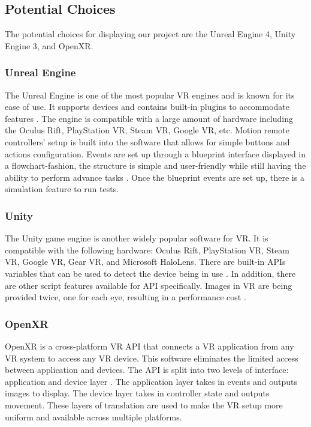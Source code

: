 \documentclass[onecolumn, draftclsnofoot,10pt, compsoc]{IEEEtran}
\begin{document}
\subsection{Potential Choices}
\begin{singlespace}
The potential choices for displaying our project are the Unreal Engine 4, Unity Engine 3, and OpenXR.  
\end{singlespace}

\subsubsection{Unreal Engine}
\begin{singlespace}
The Unreal Engine is one of the most popular VR engines and is known for its ease of use. It supports devices and contains built-in plugins to accommodate features \cite{looman}. The engine is compatible with a large amount of hardware including the Oculus Rift, PlayStation VR, Steam VR, Google VR, etc. Motion remote controllers’ setup is built into the software that allows for simple buttons and actions configuration. Events are set up through a blueprint interface displayed in a flowchart-fashion, the structure is simple and user-friendly while still having the ability to perform advance tasks \cite{UE4 EG}. Once the blueprint events are set up, there is a simulation feature to run tests.  

\end{singlespace}

\subsubsection{Unity}
\begin{singlespace}
The Unity game engine is another widely popular software for VR. It is compatible with the following hardware: Oculus Rift, PlayStation VR, Steam VR, Google VR, Gear VR, and Microsoft HaloLens. There are built-in APIs variables that can be used to detect the device being in use \cite{unity3d doc}. In addition, there are other script features available for API specifically. Images in VR are being provided twice, one for each eye, resulting in a performance cost \cite{unity3d}. 
 
\end{singlespace}

\subsubsection{OpenXR}
\begin{singlespace}
OpenXR is a cross-platform VR API that connects a VR application from any VR system to access any VR device. This software eliminates the limited access between application and devices. The API is split into two levels of interface: application and device layer \cite{khronos}. The application layer takes in events and outputs images to display. The device layer takes in controller state and outputs movement. These layers of translation are used to make the VR setup more uniform and available across multiple platforms.   
\end{singlespace}
\end{document}

